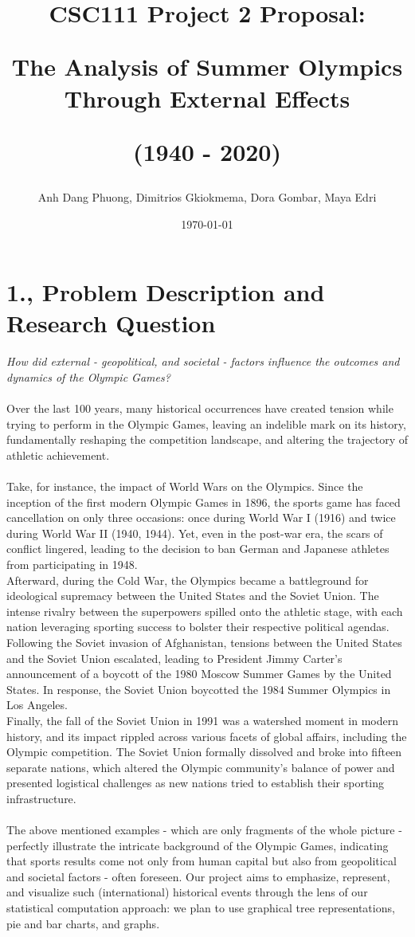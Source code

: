 \documentclass[fontsize=11pt]{article}
\title{CSC111 Project 2 Proposal: 

The Analysis of Summer Olympics Through External Effects 

(1940 - 2020)}
\author{Anh Dang Phuong, Dimitrios Gkiokmema, Dora Gombar, Maya Edri}
\date{\today}
\begin{document}
\maketitle

\section*{1., Problem Description and Research Question}

\textit{How did external - geopolitical, and societal - factors influence the outcomes and dynamics of the Olympic Games?}
\\
\\
Over the last 100 years, many historical occurrences have created tension while trying to perform in the Olympic Games, leaving an indelible mark on its history, fundamentally reshaping the competition landscape, and altering the trajectory of athletic achievement. 
\\
\\
Take, for instance, the impact of World Wars on the Olympics. Since the inception of the first modern Olympic Games in 1896, the sports game has faced cancellation on only three occasions: once during World War I (1916) and twice during World War II (1940, 1944). Yet, even in the post-war era, the scars of conflict lingered, leading to the decision to ban German and Japanese athletes from participating in 1948. 
\\ Afterward, during the Cold War, the Olympics became a battleground for ideological supremacy between the United States and the Soviet Union. The intense rivalry between the superpowers spilled onto the athletic stage, with each nation leveraging sporting success to bolster their respective political agendas. Following the Soviet invasion of Afghanistan, tensions between the United States and the Soviet Union escalated, leading to President Jimmy Carter's announcement of a boycott of the 1980 Moscow Summer Games by the United States. In response, the Soviet Union boycotted the 1984 Summer Olympics in Los Angeles.
\\ Finally, the fall of the Soviet Union in 1991 was a watershed moment in modern history, and its impact rippled across various facets of global affairs, including the Olympic competition. The Soviet Union formally dissolved and broke into fifteen separate nations, which altered the Olympic community's balance of power and presented logistical challenges as new nations tried to establish their sporting infrastructure.
\\
\\
The above mentioned examples - which are only fragments of the whole picture - perfectly illustrate the intricate background of the Olympic Games, indicating that sports results come not only from human capital but also from geopolitical and societal factors - often foreseen. Our project aims to emphasize, represent, and visualize such (international) historical events through the lens of our statistical computation approach: we plan to use graphical tree representations, pie and bar charts, and graphs.
\end{document}
